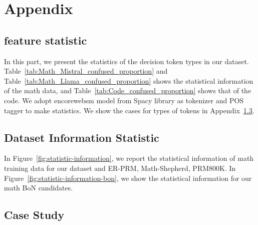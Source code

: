 
\clearpage
\section{Appendix}

\subsection{feature statistic}
\label{app:feature_statistic}

In this part, we present the statistics of the decision token types in our dataset. Table~\ref{tab:Math_Mistral_confused_proportion} and Table~\ref{tab:Math_Llama_confused_proportion} shows the statistical information of the math data, and Table~\ref{tab:Code_confused_proportion} shows that of the code. 
We adopt en\textunderscore core\textunderscore web\textunderscore sm model from Spacy library as tokenizer and POS tagger to make statistics. We show the cases for types of tokens in Appendix~\ref{app:case_study}.

\subsection{Dataset Information Statistic}
\label{app:dataset_statistic}

In Figure~\ref{fig:statistic-information}, we report the statistical information of math training data for our dataset and ER-PRM, Math-Shepherd, PRM800K\protect\footnotemark[2]. In Figure~\ref{fig:statistic-information-bon}, we show the statistical information for our math BoN candidates.

\subsection{Case Study}
\label{app:case_study}




